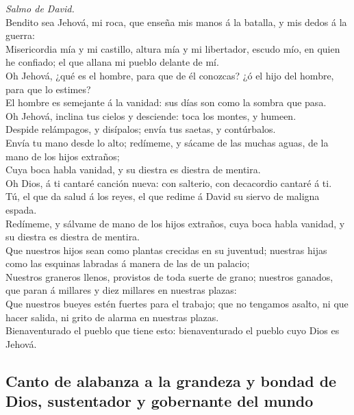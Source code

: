  \emph{Salmo de David.}\\
Bendito sea Jehová, mi roca, que enseña mis manos á la batalla, y mis
dedos á la guerra:\\
 Misericordia mía y mi castillo, altura mía y mi libertador,
escudo mío, en quien he confiado; el que allana mi pueblo delante de
mí.\\
 Oh Jehová, ¿qué es el hombre, para que de él conozcas? ¿ó
el hijo del hombre, para que lo estimes?\\
 El hombre es semejante á la vanidad: sus días son como la
sombra que pasa.\\
 Oh Jehová, inclina tus cielos y desciende: toca los montes,
y humeen.\\
 Despide relámpagos, y disípalos; envía tus saetas, y
contúrbalos.\\
 Envía tu mano desde lo alto; redímeme, y sácame de las
muchas aguas, de la mano de los hijos extraños;\\
 Cuya boca habla vanidad, y su diestra es diestra de
mentira.\\
 Oh Dios, á ti cantaré canción nueva: con salterio, con
decacordio cantaré á ti.\\
 Tú, el que da salud á los reyes, el que redime á David su
siervo de maligna espada.\\
 Redímeme, y sálvame de mano de los hijos extraños, cuya
boca habla vanidad, y su diestra es diestra de mentira.\\
 Que nuestros hijos sean como plantas crecidas en su
juventud; nuestras hijas como las esquinas labradas á manera de las de
un palacio;\\
 Nuestros graneros llenos, provistos de toda suerte de
grano; nuestros ganados, que paran á millares y diez millares en
nuestras plazas:\\
 Que nuestros bueyes estén fuertes para el trabajo; que no
tengamos asalto, ni que hacer salida, ni grito de alarma en nuestras
plazas.\\
 Bienaventurado el pueblo que tiene esto: bienaventurado el
pueblo cuyo Dios es Jehová.

\hypertarget{canto-de-alabanza-a-la-grandeza-y-bondad-de-dios-sustentador-y-gobernante-del-mundo}{%
\subsection{Canto de alabanza a la grandeza y bondad de Dios,
sustentador y gobernante del
mundo}\label{canto-de-alabanza-a-la-grandeza-y-bondad-de-dios-sustentador-y-gobernante-del-mundo}}

